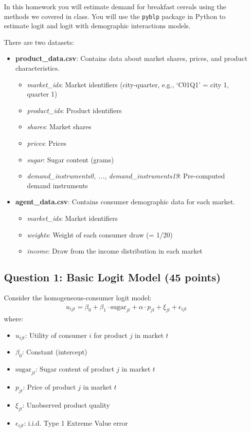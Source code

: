 \documentclass[11pt]{article}
\begin{document}
In this homework you will estimate demand for breakfast cereals using the methods we covered in class. You will use the \texttt{pyblp} package in Python to estimate logit and logit with demographic interactions models.

There are two datasets:
\begin{itemize}
	\item \textbf{product\_data.csv}: Contains data about market shares, prices, and product characteristics.
	\begin{itemize}
		\item \textit{market\_ids}: Market identifiers (city-quarter, e.g., `C01Q1' = city 1, quarter 1)
		\item \textit{product\_ids}: Product identifiers
		\item \textit{shares}: Market shares
		\item \textit{prices}: Prices
		\item \textit{sugar}: Sugar content (grams)
		\item \textit{demand\_instruments0, ..., demand\_instruments19}: Pre-computed demand instruments
	\end{itemize}
	\item \textbf{agent\_data.csv}: Contains consumer demographic data for each market.
	\begin{itemize}
		\item \textit{market\_ids}: Market identifiers
		\item \textit{weights}: Weight of each consumer draw (= 1/20)
		\item \textit{income}: Draw from the income distribution in each market
	\end{itemize}
\end{itemize}

\subsection*{Question 1: Basic Logit Model (45 points)}

Consider the homogeneous-consumer logit model:
\begin{align*}
	u_{ijt} = \beta_0 + \beta_1 \cdot \text{sugar}_{jt} + \alpha \cdot p_{jt} + \xi_{jt} + \epsilon_{ijt}
\end{align*}
where:
\begin{itemize}
	\item $u_{ijt}$: Utility of consumer $i$ for product $j$ in market $t$
	\item $\beta_0$: Constant (intercept)
	\item $\text{sugar}_{jt}$: Sugar content of product $j$ in market $t$
	\item $p_{jt}$: Price of product $j$ in market $t$
	\item $\xi_{jt}$: Unobserved product quality
	\item $\epsilon_{ijt}$: i.i.d. Type 1 Extreme Value error
\end{itemize}
\end{document}
